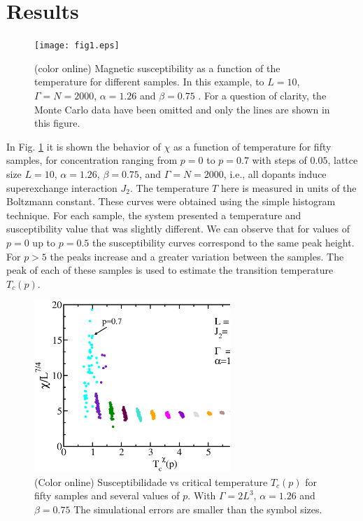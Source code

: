 \documentclass[twocolumn,5p,12pt]{elsarticle}
\begin{document}
\section{Results}
\begin{figure}[htb]
\begin{center}
\texttt{[image: fig1.eps]}
\end{center}
\caption{(color online) Magnetic susceptibility as a function of the temperature for different samples. In this example, to $L=10$, $\Gamma=N=2000$, $\alpha=1.26$ and $\beta= 0.75$ . For a question of clarity, the Monte Carlo data have been omitted and only the lines are shown in this figure.}
\label{fig:1}
\end{figure}

In Fig. \ref{fig:1} it is shown the behavior of $\chi$ as a function of temperature for fifty samples, for concentration ranging from $p=0$ to $p=0.7$ with steps of $0.05$,  lattce size $L=10$, $\alpha=1.26$, $\beta= 0.75$, and $\Gamma = N = 2000$, i.e., all dopants induce superexchange interaction $J_2$. The temperature $T$ here is measured in units of the Boltzmann constant. These curves were obtained using the simple histogram technique. For each sample, the system presented a temperature and susceptibility value that was slightly different. We can observe that for values of $p =0 $ up to $p=0.5$ the susceptibility curves correspond to the same peak height. For $p >5$ the peaks increase and a greater variation between the samples. The peak of each of these samples is used to estimate the transition temperature $T_c(p)$.

\begin{figure}[htb]
\includegraphics[width = 7.4cm]{fig2.eps}
\caption{(Color online) Susceptibilidade vs critical temperature $T_c(p)$  for fifty samples and several values of $p$. With $\Gamma=2L^3$, $\alpha=1.26$ and $\beta= 0.75$ The simulational errors are smaller than the symbol sizes.}
\label{fig:2}
\end{figure}
\end{document}
